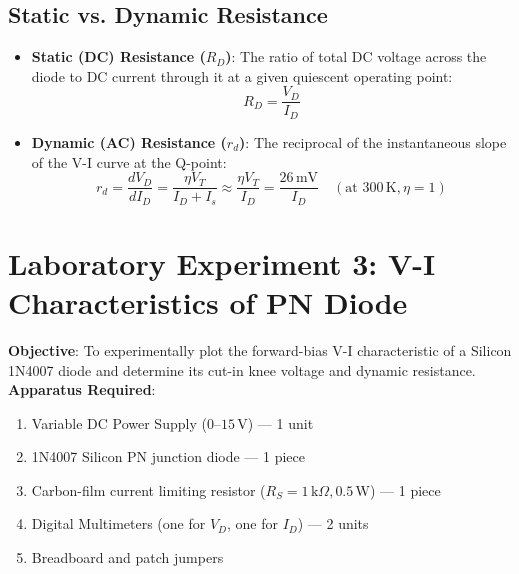 \subsection{Static vs. Dynamic Resistance}
\begin{definition}
\begin{itemize}
    \item \textbf{Static (DC) Resistance ($R_D$)}: The ratio of total DC voltage across the diode to DC current through it at a given quiescent operating point:
    \[ R_D = \frac{V_D}{I_D} \]
    \item \textbf{Dynamic (AC) Resistance ($r_d$)}: The reciprocal of the instantaneous slope of the V-I curve at the Q-point:
    \[ r_d = \frac{d V_D}{d I_D} = \frac{\eta V_T}{I_D + I_s} \approx \frac{\eta V_T}{I_D} = \frac{26\,\mathrm{mV}}{I_D} \quad (\text{at } 300\,\mathrm{K}, \eta=1) \]
\end{itemize}
\end{definition}

\section{Laboratory Experiment 3: V-I Characteristics of PN Diode}
\begin{experimentbox}
\textbf{Objective}: To experimentally plot the forward-bias V-I characteristic of a Silicon 1N4007 diode and determine its cut-in knee voltage and dynamic resistance.\\
\textbf{Apparatus Required}:
\begin{enumerate}
    \item Variable DC Power Supply ($0\text{--}15\,\mathrm{V}$) --- 1 unit
    \item 1N4007 Silicon PN junction diode --- 1 piece
    \item Carbon-film current limiting resistor ($R_S = 1\,\mathrm{k}\Omega, 0.5\,\mathrm{W}$) --- 1 piece
    \item Digital Multimeters (one for $V_D$, one for $I_D$) --- 2 units
    \item Breadboard and patch jumpers
\end{enumerate}
\end{experimentbox}

